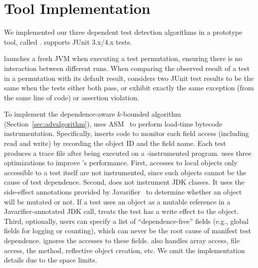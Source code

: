 \section{Tool Implementation}
\label{sec:impl}


We implemented our three dependent test detection algorithms in
a prototype tool, called \ourtool. \ourtool
supports JUnit 3.x/4.x tests. %

\ourtool launches a fresh JVM when
executing a test permutation, ensuring there is no interaction between
different runs. When comparing the observed result of
a test in a permutation with its default result,
\ourtool considers two JUnit test results to be the same when the
tests either both pass, or exhibit exactly the same exception
(from the same line of code) or assertion violation.

 

To implement the dependence-aware $k$-bounded algorithm (Section~\ref{sec:advalgorithm}),
\ourtool uses ASM~\cite{asm} to perform load-time bytecode
instrumentation. Specifically, \ourtool inserts code to monitor each
field access (including read and write) by recording the
object ID and the field name. Each test produces a trace file after being
executed on a \ourtool-instrumented program.
\ourtool uses three optimizations to improve \ourtool's performance.
First, accesses to local objects
only accessible to a test itself are not instrumented,
since such objects cannot
be the cause of test dependence. Second,
\ourtool does not instrument JDK classes. It uses the side-effect
annotations provided by Javarifier~\cite{QuinonezTE2008} to 
determine whether an object will be mutated or not.
If a test uses an object as a mutable reference
in a Javarifier-annotated JDK call, \ourtool treats the test
has a write effect to the object.
Third, optionally, users can specify a list of ``dependence-free''
fields (e.g., global fields for logging or counting), which can
never be the root cause of manifest test dependence. \ourtool
ignores the accesses to these fields.
\ourtool also handles array access, file access, 
the  method, reflective object creation, etc.
We omit the implementation details due to the space limits.


